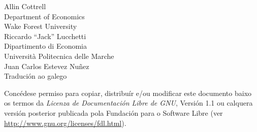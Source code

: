\documentclass[oneside,galician]{book}
\begin{document}
\VerbatimFootnotes

\setlength{\parindent}{0pt}
\setlength{\parskip}{1ex}



\thispagestyle{empty}

\begin{center}



{\large \sffamily
Allin Cottrell\\
Department of Economics\\
Wake Forest University\\

\vspace{20pt}
Riccardo ``Jack'' Lucchetti\\
Dipartimento di Economia\\
Università Politecnica delle Marche\\

\vspace{20pt}
Juan Carlos Estevez Nuñez\\
Tradución ao galego

\vspace{20pt}

}

\end{center}
\clearpage


\thispagestyle{empty}


\vspace*{2in}

Concédese permiso para copiar, distribuír e/ou modificar este documento baixo
os termos da \emph{Licenza de Documentación Libre de GNU}, Versión 1.1 ou
calquera versión posterior publicada pola Fundación para o Software Libre
(ver \url{http://www.gnu.org/licenses/fdl.html}).

\clearpage


\pagestyle{headings}

\tableofcontents

\clearpage








\clearpage

\end{document}
